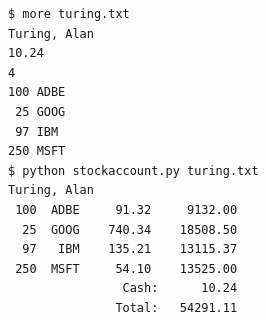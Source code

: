 \documentclass[8pt,a4paper,compress,handout]{beamer}
\begin{document}
\begin{frame}[fragile]
\begin{lstlisting}[language={}]
$ more turing.txt 
Turing, Alan
10.24
4
100 ADBE
 25 GOOG
 97 IBM
250 MSFT
$ python stockaccount.py turing.txt 
Turing, Alan
 100  ADBE     91.32     9132.00
  25  GOOG    740.34    18508.50
  97   IBM    135.21    13115.37
 250  MSFT     54.10    13525.00
                Cash:      10.24
               Total:   54291.11
\end{lstlisting}
\end{frame}
\end{document}
